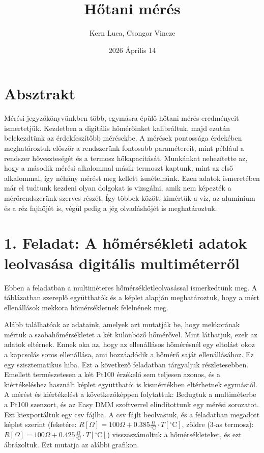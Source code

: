 \documentclass{article}
\title{Hőtani mérés}
\author{Kern Luca, Csongor Vincze}
\date{2026 Április 14}
\begin{document}
\maketitle

\section*{Absztrakt}

Mérési jegyzőkönyvünkben több, egymásra épülő hőtani mérés eredményeit ismertetjük. Kezdetben a digitális hőmérőinket kalibráltuk, majd ezután belekezdtünk az érdekfeszítőbb mérésekbe. A mérések pontossága érdekében meghatároztuk először a rendszerünk fontosabb paramétereit, mint például a rendszer hőveszteségét és a termosz hőkapacitását. Munkánkat nehezítette az, hogy a második mérési alkalommal másik termoszt kaptunk, mint az első alkalommal, így néhány mérést meg kellett ismételnünk. Ezen adatok ismeretében már el tudtunk kezdeni olyan dolgokat is vizsgálni, amik nem képezték a mérőrendszerünk szerves részét. Így többek között kimértük a víz, az alumínium és a réz fajhőjét is, végül pedig a jég olvadáshőjét is meghatároztuk.

\section*{1. Feladat: A hőmérsékleti adatok leolvasása digitális multiméterről}

Ebben a feladatban a multiméteres hőmérsékletleolvasással ismerkedtünk meg. A táblázatban szereplő együtthatók és a képlet alapján meghatároztuk, hogy a mért ellenállások mekkora hőmérsékletnek felelnének meg.

Alább találhatóak az adataink, amelyek azt mutatják be, hogy mekkorának mértük a szobahőmérsékletet a két különböző hőmérővel. Mint láthatjuk, ezek az adatok eltérnek. Ennek oka az, hogy az ellenállásos hőmérésnél egy eltolást okoz a kapcsolás soros ellenállása, ami hozzáadódik a hőmérő saját ellenállásához. Ez egy szisztematikus hiba. Ezt a következő feladatban tárgyaljuk részletesebben. Emellett természetesen a két Pt100 érzékelő sem teljesen azonos, és a kiértékeléshez használt képlet együtthatói is kismértékben eltérhetnek egymástól.
A mérést és kiértékelést a következőképpen folytattuk: Bedugtuk a multiméterbe a Pt100 szenzort, és az Easy DMM szoftverrel elindítottunk egy mérési sorozatot. Ezt kiexportáltuk egy csv fájlba. A csv fájlt beolvastuk, és a feladatban megadott képlet szerint (feketére: $ R[\Omega]=100 \Omega+0.385 \frac{\Omega}{{ }^{\circ} \mathrm{C}} \cdot T\left[{ }^{\circ} \mathrm{C}\right] $, zöldre (3-as termosz): $ R[\Omega]=100 \Omega+0.425 \frac{\Omega}{{ }^{\circ} \mathrm{C}} \cdot T\left[{ }^{\circ} \mathrm{C}\right] $) visszaszámoltuk a hőmérsékleteket, és ezt ábrázoltuk. Ezt mutatja az alábbi grafikon.
\end{document}
